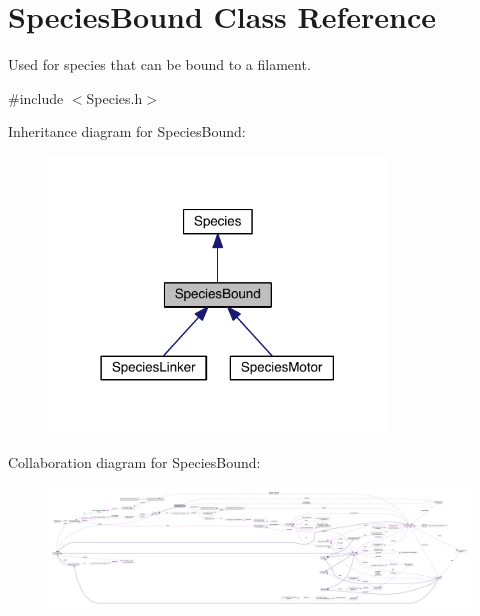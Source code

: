 \hypertarget{classSpeciesBound}{\section{Species\+Bound Class Reference}
\label{classSpeciesBound}
}


Used for species that can be bound to a filament.  




{\ttfamily \#include $<$Species.\+h$>$}



Inheritance diagram for Species\+Bound\+:\nopagebreak
\begin{figure}[H]
\begin{center}
\leavevmode
\includegraphics[width=254pt]{classSpeciesBound__inherit__graph}
\end{center}
\end{figure}


Collaboration diagram for Species\+Bound\+:\nopagebreak
\begin{figure}[H]
\begin{center}
\leavevmode
\includegraphics[width=350pt]{classSpeciesBound__coll__graph}
\end{center}
\end{figure}
